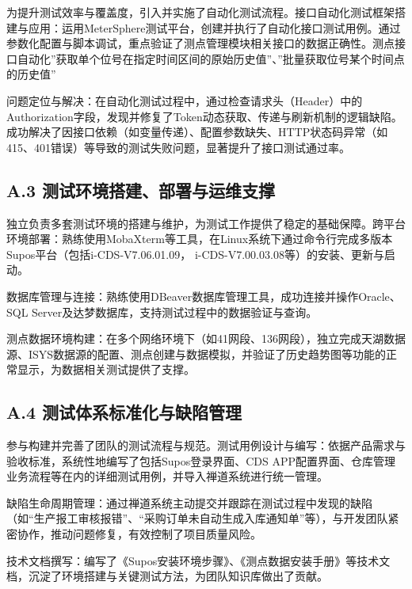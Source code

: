 \documentclass[
  12pt,
]{article}
\begin{document}
为提升测试效率与覆盖度，引入并实施了自动化测试流程。接口自动化测试框架搭建与应用：运用MeterSphere测试平台，创建并执行了自动化接口测试用例。通过参数化配置与脚本调试，重点验证了测点管理模块相关接口的数据正确性。测点接口自动化''获取单个位号在指定时间区间的原始历史值''、''批量获取位号某个时间点的历史值''

问题定位与解决：在自动化测试过程中，通过检查请求头（Header）中的Authorization字段，发现并修复了Token动态获取、传递与刷新机制的逻辑缺陷。成功解决了因接口依赖（如变量传递）、配置参数缺失、HTTP状态码异常（如415、401错误）等导致的测试失败问题，显著提升了接口测试通过率。

\subsection{A.3
测试环境搭建、部署与运维支撑}\label{a.3-ux6d4bux8bd5ux73afux5883ux642dux5efaux90e8ux7f72ux4e0eux8fd0ux7ef4ux652fux6491}

独立负责多套测试环境的搭建与维护，为测试工作提供了稳定的基础保障。跨平台环境部署：熟练使用MobaXterm等工具，在Linux系统下通过命令行完成多版本Supos平台（包括i-CDS-V7.06.01.09，
i-CDS-V7.00.03.08等）的安装、更新与启动。

数据库管理与连接：熟练使用DBeaver数据库管理工具，成功连接并操作Oracle、SQL
Server及达梦数据库，支持测试过程中的数据验证与查询。

测点数据环境构建：在多个网络环境下（如41网段、136网段），独立完成天湖数据源、ISYS数据源的配置、测点创建与数据模拟，并验证了历史趋势图等功能的正常显示，为数据相关测试提供了支撑。

\subsection{A.4
测试体系标准化与缺陷管理}\label{a.4-ux6d4bux8bd5ux4f53ux7cfbux6807ux51c6ux5316ux4e0eux7f3aux9677ux7ba1ux7406}

参与构建并完善了团队的测试流程与规范。测试用例设计与编写：依据产品需求与验收标准，系统性地编写了包括Supos登录界面、CDS
APP配置界面、仓库管理业务流程等在内的详细测试用例，并导入禅道系统进行统一管理。

缺陷生命周期管理：通过禅道系统主动提交并跟踪在测试过程中发现的缺陷（如``生产报工审核报错''、``采购订单未自动生成入库通知单''等），与开发团队紧密协作，推动问题修复，有效控制了项目质量风险。

技术文档撰写：编写了《Supos安装环境步骤》、《测点数据安装手册》等技术文档，沉淀了环境搭建与关键测试方法，为团队知识库做出了贡献。
\end{document}
